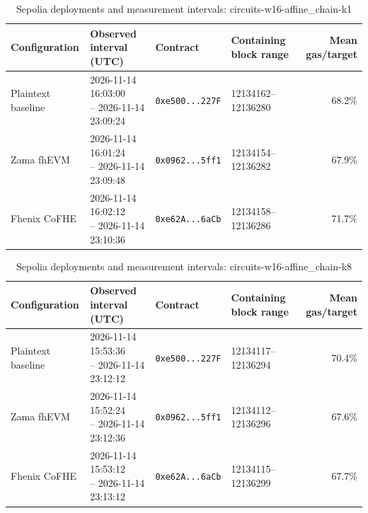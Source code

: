 \begin{table}[!t]
\caption{Sepolia deployments and measurement intervals: circuits-w16-affine\_chain-k1}
\label{tab:sepolia-circuits-w16-affine-chain-k1}
\centering
\footnotesize
\setlength{\tabcolsep}{4pt}
\begin{tabular}{|l|l|l|l|r|}
\hline
\textbf{Configuration} & \textbf{Observed interval (UTC)} & \textbf{Contract} & \textbf{Containing block range} & \textbf{Mean gas/target} \\
\hline
Plaintext baseline & \shortstack[l]{2026-11-14 16:03:00 \\ -- 2026-11-14 23:09:24} & \texttt{0xe500...227F} & 12134162--12136280 & 68.2\% \\
\hline
Zama fhEVM & \shortstack[l]{2026-11-14 16:01:24 \\ -- 2026-11-14 23:09:48} & \texttt{0x0962...5ff1} & 12134154--12136282 & 67.9\% \\
\hline
Fhenix CoFHE & \shortstack[l]{2026-11-14 16:02:12 \\ -- 2026-11-14 23:10:36} & \texttt{0xe62A...6aCb} & 12134158--12136286 & 71.7\% \\
\hline
\end{tabular}
\end{table}

\begin{table}[!t]
\caption{Sepolia deployments and measurement intervals: circuits-w16-affine\_chain-k8}
\label{tab:sepolia-circuits-w16-affine-chain-k8}
\centering
\footnotesize
\setlength{\tabcolsep}{4pt}
\begin{tabular}{|l|l|l|l|r|}
\hline
\textbf{Configuration} & \textbf{Observed interval (UTC)} & \textbf{Contract} & \textbf{Containing block range} & \textbf{Mean gas/target} \\
\hline
Plaintext baseline & \shortstack[l]{2026-11-14 15:53:36 \\ -- 2026-11-14 23:12:12} & \texttt{0xe500...227F} & 12134117--12136294 & 70.4\% \\
\hline
Zama fhEVM & \shortstack[l]{2026-11-14 15:52:24 \\ -- 2026-11-14 23:12:36} & \texttt{0x0962...5ff1} & 12134112--12136296 & 67.6\% \\
\hline
Fhenix CoFHE & \shortstack[l]{2026-11-14 15:53:12 \\ -- 2026-11-14 23:13:12} & \texttt{0xe62A...6aCb} & 12134115--12136299 & 67.7\% \\
\hline
\end{tabular}
\end{table}

